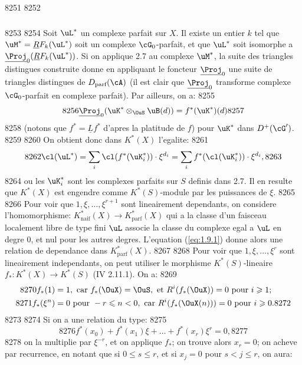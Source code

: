  8251	
  8252	\subsubsection{}
  8253	
  8254	Soit $\uL^*$ un complexe parfait sur $X$. Il existe un entier $k$ tel que $\uM^* = \underline{R}F_k(\uL^*)$ soit un complexe $\cG_0$-parfait, et que $\uL^*$ soit isomorphe a $\underline{\Proj}_0(\underline{R}F_k(\uL^*))$. Si on applique 2.7 au complexe $\uM^*$, la suite des triangles distingues construite donne en appliquant le foncteur $\underline{\Proj}_0$ une suite de triangles distingues de $D_{\text{parf}}(\cA)$ (il est clair que $\underline{\Proj}_0$ transforme complexe $\cG_0$-parfait en complexe parfait). Par ailleurs, on a:
  8255	\[
  8256	\underline{\Proj}_0(\uK^* \otimes_{\OuS} \uB(d)) = f^*(\uK^*)(d)
  8257	\]
  8258	(notons que $f^* = \underline{L}f^*$ d'apres la platitude de $f$) pour $\uK^*$ dans $D^+(\cG')$.
  8259	
  8260	On obtient donc dans $K^*(X)$ l'egalite:
  8261	\[
  8262	\cl(\uL^*) = \sum_i \cl(f^*(\uK_i^*)) \cdot \xi^{d_i} = \sum_i f^*(\cl(\uK_i^*)) \cdot \xi^{d_i},
  8263	\]
  8264	ou les $\uK_i^*$ sont les complexes parfaits sur $S$ definis dans 2.7. Il en resulte que $K^*(X)$ est engendre comme $K^*(S)$-module par les puissances de $\xi$.
  8265	
  8266	Pour voir que $1, \xi, \ldots, \xi^{r+1}$ sont lineairement dependants, on considere l'homomorphisme: $K^*_{\text{naif}}(X) \to K^*_{\text{parf}}(X)$ qui a la classe d'un faisceau localement libre de type fini $\uL$ associe la classe du complexe egal a $\uL$ en degre $0$, et nul pour les autres degres. L'equation (\ref{eq:1.9.1}) donne alors une relation de dependance dans $K^*_{\text{parf}}(X)$.
  8267	
  8268	Pour voir que $1, \xi, \ldots, \xi^r$ sont lineairement independants, on peut utiliser le morphisme $K^*(S)$-lineaire $f_* : K^*(X) \to K^*(S)$ (IV 2.11.1). On a:
  8269	\begin{align*}
  8270	f_*(1) &= 1, \text{ car } f_*(\OuX) = \OuS, \text{ et } R^i(f_*(\OuX)) = 0 \text{ pour } i \geqslant 1;\\
  8271	f_*(\xi^n) &= 0 \text{ pour } -r \leqslant n < 0, \text{ car } R^i(f_*(\OuX(n))) = 0 \text{ pour } i \geqslant 0.
  8272	\end{align*}
  8273	
  8274	Si on a une relation du type:
  8275	\[
  8276	f^*(x_0) + f^*(x_1)\xi + \ldots + f^*(x_r)\xi^r = 0,
  8277	\]
  8278	on la multiplie par $\xi^{-r}$, et on applique $f_*$; on trouve alors $x_r = 0$; on acheve par recurrence, en notant que si $0 \leqslant s \leqslant r$, et si $x_j = 0$ pour $s < j \leqslant r$, on aura:
